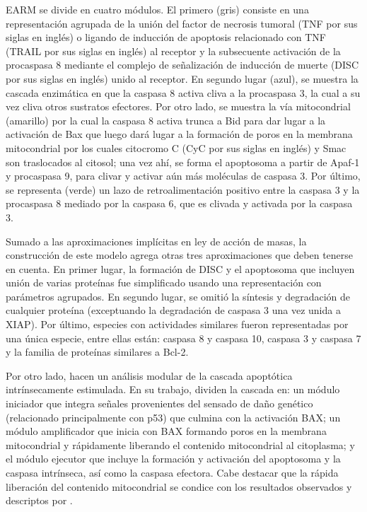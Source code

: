 EARM se divide en cuatro módulos. El primero (gris) consiste en una representación agrupada de la unión del factor de necrosis tumoral (TNF por sus siglas en inglés) o ligando de inducción de apoptosis relacionado con TNF (TRAIL por sus siglas en inglés) al receptor y la subsecuente activación de la procaspasa 8 mediante el complejo de señalización de inducción de muerte (DISC por sus siglas en inglés) unido al receptor. En segundo lugar (azul), se muestra la cascada enzimática en que la caspasa 8 activa cliva a la procaspasa 3, la cual a su vez cliva otros sustratos efectores. Por otro lado, se muestra la vía mitocondrial (amarillo) por la cual la caspasa 8 activa trunca a Bid para dar lugar a la activación de Bax que luego dará lugar a la formación de poros en la membrana mitocondrial por los cuales citocromo C (CyC por sus siglas en inglés) y Smac son traslocados al citosol; una vez ahí, se forma el apoptosoma a partir de Apaf-1 y procaspasa 9, para clivar y activar aún más moléculas de caspasa 3. Por último, se representa (verde) un lazo de retroalimentación positivo entre la caspasa 3 y la procaspasa 8 mediado por la caspasa 6, que es clivada y activada por la caspasa 3.

Sumado a las aproximaciones implícitas en ley de acción de masas, la construcción de este modelo agrega otras tres aproximaciones que deben tenerse en cuenta. En primer lugar, la formación de DISC y el apoptosoma que incluyen unión de varias proteínas fue simplificado usando una representación con parámetros agrupados. En segundo lugar, se omitió la síntesis y degradación de cualquier proteína (exceptuando la degradación de caspasa 3 una vez unida a XIAP). Por último, especies con actividades similares fueron representadas por una única especie, entre ellas están: caspasa 8 y caspasa 10, caspasa 3 y caspasa 7 y la familia de proteínas similares a Bcl-2.

Por otro lado, \cite{Zhang2009} hacen un análisis modular de la cascada apoptótica intrínsecamente estimulada. En su trabajo, dividen la cascada en: un módulo iniciador que integra señales provenientes del sensado de daño genético (relacionado principalmente con p53) que culmina con la activación BAX; un módulo amplificador que inicia con BAX formando poros en la membrana mitocondrial y rápidamente liberando el contenido mitocondrial al citoplasma; y el módulo ejecutor que incluye la formación y activación del apoptosoma y la caspasa intrínseca, así como la caspasa efectora. Cabe destacar que la rápida liberación del contenido mitocondrial se condice con los resultados observados y descriptos por \cite{Albeck2008}.

